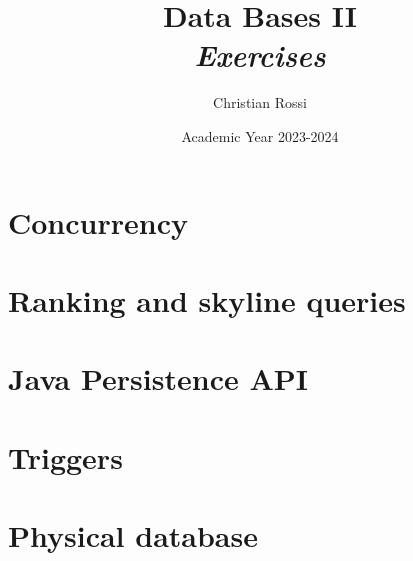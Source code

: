 \documentclass[12pt, a4paper]{report}
\title{Data Bases II \\ \textit{Exercises}}
\author{Christian Rossi}
\date{Academic Year 2023-2024}
\begin{document}
    \maketitle

    

    \cleardoublepage

    \tableofcontents

    \cleardoublepage

    \chapter{Concurrency}
    
    
    
    
    
    
    
    
    
    
    
    
    
    
    
    
    
    
    
    
    

    \chapter{Ranking and skyline queries}
    
    
    
    

    \chapter{Java Persistence API}
    
    
    
    

    \chapter{Triggers}
    
    
    
    

    \chapter{Physical database}
    
    
    
        
    
         
    
\end{document}
